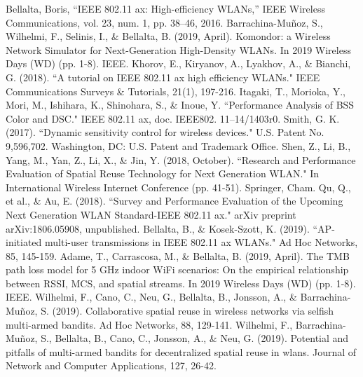 \documentclass[conference]{IEEEtran}
\begin{document}
	\begin{thebibliography}{00}
		 Bellalta, Boris, ``IEEE 802.11 ax: High-efficiency WLANs,'' IEEE Wireless Communications, vol. 23, num. 1, pp. 38--46, 2016.
		 Barrachina-Mu\~noz, S., Wilhelmi, F., Selinis, I., \& Bellalta, B. (2019, April). Komondor: a Wireless Network Simulator for Next-Generation High-Density WLANs. In 2019 Wireless Days (WD) (pp. 1-8). IEEE.
		 Khorov, E., Kiryanov, A., Lyakhov, A., \& Bianchi, G. (2018). ``A tutorial on IEEE 802.11 ax high efficiency WLANs." IEEE Communications Surveys \& Tutorials, 21(1), 197-216.
		 Itagaki, T., Morioka, Y., Mori, M., Ishihara, K., Shinohara, S., \& Inoue, Y. ``Performance Analysis of BSS Color and DSC." IEEE 802.11 ax, doc. IEEE802. 11–14/1403r0. 
		 Smith, G. K. (2017). ``Dynamic sensitivity control for wireless devices." U.S. Patent No. 9,596,702. Washington, DC: U.S. Patent and Trademark Office.
		 Shen, Z., Li, B., Yang, M., Yan, Z., Li, X., \& Jin, Y. (2018, October). ``Research and Performance Evaluation of Spatial Reuse Technology for Next Generation WLAN." In International Wireless Internet Conference (pp. 41-51). Springer, Cham.
		 Qu, Q., et al., \& Au, E. (2018). ``Survey and Performance Evaluation of the Upcoming Next Generation WLAN Standard-IEEE 802.11 ax." arXiv preprint arXiv:1806.05908, unpublished.
		 Bellalta, B., \& Kosek-Szott, K. (2019). ``AP-initiated multi-user transmissions in IEEE 802.11 ax WLANs." Ad Hoc Networks, 85, 145-159.
		 Adame, T., Carrascosa, M., \& Bellalta, B. (2019, April). The TMB path loss model for 5 GHz indoor WiFi scenarios: On the empirical relationship between RSSI, MCS, and spatial streams. In 2019 Wireless Days (WD) (pp. 1-8). IEEE.
		 Wilhelmi, F., Cano, C., Neu, G., Bellalta, B., Jonsson, A., \& Barrachina-Mu\~noz, S. (2019). Collaborative spatial reuse in wireless networks via selfish multi-armed bandits. Ad Hoc Networks, 88, 129-141.
		 Wilhelmi, F., Barrachina-Mu\~noz, S., Bellalta, B., Cano, C., Jonsson, A., \& Neu, G. (2019). Potential and pitfalls of multi-armed bandits for decentralized spatial reuse in wlans. Journal of Network and Computer Applications, 127, 26-42.
	\end{thebibliography}
	
\end{document}
